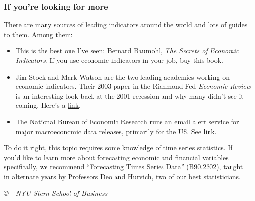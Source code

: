 \documentclass[letterpaper,12pt]{article}
\begin{document}
\subsubsection*{If you're looking for more}

There are many sources of leading indicators around the world
and lots of guides to them.
Among them:
%
\begin{itemize}

\item This is the best one I've seen:
Bernard Baumohl,
{\it The Secrets of Economic Indicators\/}.
If you use economic indicators in your job,
buy this book.




\item Jim Stock and Mark Watson are the two leading academics working on
economic indicators.  Their 2003 paper in the Richmond Fed {\it Economic Review\/}
is an interesting look back at the 2001 recession
and why many didn't see it coming.
Here's a
\href{http://www.richmondfed.org/publications/economic_research/economic_quarterly/pdfs/summer2003/stockwatsonsummer03.pdf}
{link}.
\item The National Bureau of Economic Research
runs an email alert service
for major macroeconomic data releases, primarily for the US.  See
\href{http://nber.org/releases/}{link}.
\end{itemize}
%
To do it right, this topic requires some knowledge of time series statistics.
If you'd like to learn more about forecasting economic and
financial variables specifically,
we recommend ``Forecasting Times Series Data'' (B90.2302),
taught in alternate years by Professors Deo and Hurvich, two of our best statisticians.

\vfill \centerline{\it \copyright \ \number\year \
NYU Stern School of Business}
\end{document}
